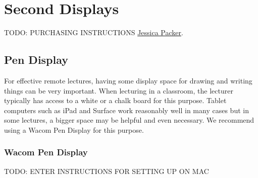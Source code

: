 \chapter{Second Displays}
\label{ch:displays}

\begin{gram}
\label{grm:displays::preamble}
TODO: PURCHASING INSTRUCTIONS
\href{mailto:jpacker@andrew.cmu.edu}{Jessica Packer}.
%
\end{gram}


\section{Pen Display}
\label{ch:displays::pen}

For effective remote lectures, having some display space for drawing and writing things can be very important.  When lecturing in a classroom, the lecturer typically has access to a white or a chalk  board for this purpose.  
%
Tablet computers such as iPad and Surface work reasonably well in many cases but in some lectures, a bigger space may be helpful and even necessary. 
%
We recommend using a Wacom Pen Display for this purpose.

\subsection{Wacom Pen Display}
\label{sec:displays::wacom}


\begin{gram}
\label{grm:displays::wacom::16::mac-setup}

TODO: ENTER INSTRUCTIONS FOR SETTING UP ON MAC
\end{gram}


